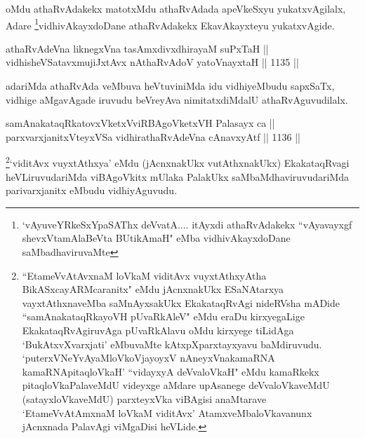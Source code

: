 \begin{artha}
oMdu athaRvAdakekx matotxMdu athaRvAdada apeVkeSxyu yukatxvAgilalx, Adare \footnote{`vAyuveYRkeSxYpaSAThx deVvatA.... itAyxdi athaRvAdakekx ``vAyavayxgf shevxVtamAlaBeVta BUtikAmaH" eMba vidhivAkayxdoDane saMbadhaviruvaMte}vidhivAkayxdoDane athaRvAdakekx EkavAkayxteyu yukatxvAgide.
\end{artha}

\begin{shl}
athaRvAdeVna liknegxVna tasAmxdivxdhirayaM suPxTaH || \\
vidhisheVSatavxmujiJxtAvx nAthaRvAdoV yatoV\s nayxtaH \hfill || 1135 ||  
\end{shl}

\begin{artha}
adariMda athaRvAda veMbuva heVtuviniMda idu vidhiyeMbudu sapxSaTx, vidhige aMgavAgade iruvudu beVreyAva nimitatxdiMdalU athaRvAguvudilalx.
\end{artha}


\begin{shl}
samAnakataqRkatovxVketxVviRBAgoVketxVH Palasayx ca || \\
parxvarxjanitxVteyxVSa vidhirathaRvAdeVna cAnavxyAtf \hfill || 1136 ||  
\end{shl}

\begin{artha}
\footnote{``EtameVvA\s \s tAvxnaM loVkaM viditAvx vuyxtAthxyAtha BikASxcayARMcaranitx" eMdu jAcnxnakUkx ESaNAtarxya vayxtAthxnaveMba saMnAyxsakUkx EkakataqRvAgi nideRVsha mADide ``samAnakataqRkayoVH pUvaRkAleV" eMdu eraDu kirxyegaLige EkakataqRvAgiruvAga pUvaRkAlavu oMdu kirxyege tiLidAga `BukAtxvXvarxjati' eMbuvaMte kAtxpXparxtayxyavu baMdiruvudu. `puterxVNeYvAyaMloVkoVjayoyxV nAneyxVnakamaRNA kamaRNApitaqloVkaH' ``vidayxyA deVvaloVkaH" eMdu kamaRkekx pitaqloVkaPalaveMdU videyxge aMdare upAsanege deVvaloVkaveMdU (satayxloVkaveMdU) parxteyxVka viBAgisi anaMtarave `EtameVvA\s \s tAmxnaM loVkaM viditAvx' AtamxveMbaloVkavanunx jAcnxnada PalavAgi viMgaDisi heVLide.}`viditAvx vuyxtAthxya' eMdu (jAcnxnakUkx vutAthxnakUkx) EkakataqRvagi heVLiruvudariMda viBAgoVkitx mUlaka PalakUkx saMbaMdhaviruvudariMda parivarxjanitx eMbudu vidhiyAguvudu.
\end{artha}


